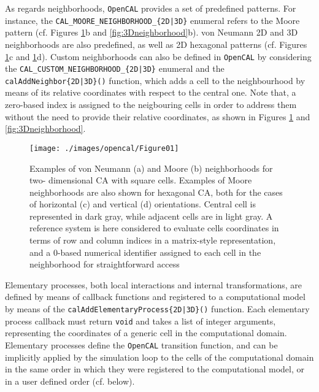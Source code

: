  As regards neighborhoods, \texttt{OpenCAL} provides a set of predefined
patterns. For instance, the \verb'CAL_MOORE_NEIGHBORHOOD_{2D|3D}'
enumeral refers to the Moore pattern (cf. Figures
\ref{fig:2Dneighborhood}b and \ref{fig:3Dneighborhood}b). von
Neumann 2D and 3D neighborhoods are also predefined, as well as 2D
hexagonal patterns (cf. Figures \ref{fig:2Dneighborhood}c and
\ref{fig:2Dneighborhood}d). Custom neighborhoods can also be defined
in \texttt{OpenCAL} by considering the \verb'CAL_CUSTOM_NEIGHBORHOOD_{2D|3D}'
enumeral and the \verb'calAddNeighbor{2D|3D}()' function, which adds
a cell to the neighbourhood by means of its relative coordinates
with respect to the central one. Note that, a zero-based index is
assigned to the neigbouring cells in order to address them without
the need to provide their relative coordinates, as shown in Figures
\ref{fig:2Dneighborhood} and \ref{fig:3Dneighborhood}.
\begin{figure}[!htbp]
	\begin{center}
		\texttt{[image: ./images/opencal/Figure01]}
		\caption{Examples of von Neumann (a) and Moore (b) neighborhoods for two-
			dimensional CA with square cells. Examples of Moore neighborhoods are also shown for hexagonal CA, both for the cases of horizontal (c) and vertical (d) orientations. Central cell is represented in dark gray, while adjacent cells are in light gray. A reference system is here considered to evaluate cells coordinates in terms of row and column indices in a matrix-style representation, and a 0-based numerical identifier assigned to each cell in the neighborhood for straightforward access}
		\label{fig:2Dneighborhood}
	\end{center}
\end{figure}
Elementary processes, both local interactions and internal
transformations, are defined by means of callback functions and
registered to a computational model by means of the
\verb'calAddElementaryProcess{2D|3D}()' function. Each elementary
process callback must return \verb'void' and takes a list of integer
arguments, representing the coordinates of a generic cell in the
computational domain. Elementary processes define the \texttt{OpenCAL}
transition function, and can be implicitly applied by the simulation
loop to the cells of the computational domain in the same order in
which they were registered to the computational model, or in a user
defined order (cf. below).


